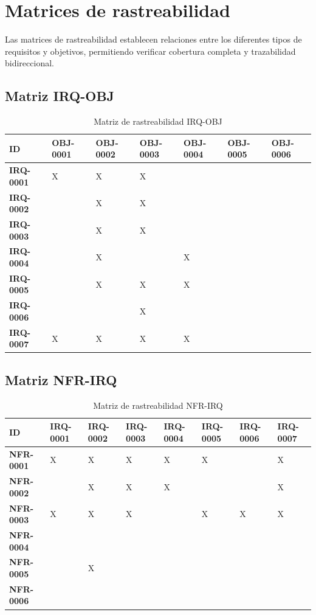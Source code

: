 \documentclass[11pt, a4paper]{article}
\begin{document}
\section{Matrices de rastreabilidad}

Las matrices de rastreabilidad establecen relaciones entre los diferentes tipos de requisitos y objetivos, permitiendo verificar cobertura completa y trazabilidad bidireccional.

\subsection{Matriz IRQ-OBJ}

\begin{table}[htbp]
\centering
\small
\begin{tabular}{|p{2.2cm}|p{2.0cm}|p{2.0cm}|p{2.0cm}|p{2.0cm}|p{2.0cm}|p{2.0cm}|}
\hline
\textbf{ID} & \textbf{OBJ-0001} & \textbf{OBJ-0002} & \textbf{OBJ-0003} & \textbf{OBJ-0004} & \textbf{OBJ-0005} & \textbf{OBJ-0006} \\
\hline
\hline
\textbf{IRQ-0001} & X & X & X & & & \\
\hline
\textbf{IRQ-0002} & & X & X & & & \\
\hline
\textbf{IRQ-0003} & & X & X & & & \\
\hline
\textbf{IRQ-0004} & & X & & X & & \\
\hline
\textbf{IRQ-0005} & & X & X & X & & \\
\hline
\textbf{IRQ-0006} & & & X & & & \\
\hline
\textbf{IRQ-0007} & X & X & X & X & & \\
\hline
\end{tabular}
\caption{Matriz de rastreabilidad IRQ-OBJ}
\label{tab:matriz-irq-obj}
\end{table}

\subsection{Matriz NFR-IRQ}

{\setlength{\tabcolsep}{3pt}
\begin{table}[htbp]
\centering
\footnotesize
\begin{tabular}{|p{1.6cm}|p{1.55cm}|p{1.55cm}|p{1.55cm}|p{1.55cm}|p{1.55cm}|p{1.55cm}|p{1.55cm}|}
\hline
\textbf{ID} & \textbf{IRQ-0001} & \textbf{IRQ-0002} & \textbf{IRQ-0003} & \textbf{IRQ-0004} & \textbf{IRQ-0005} & \textbf{IRQ-0006} & \textbf{IRQ-0007} \\
\hline
\hline
\textbf{NFR-0001} & X & X & X & X & X & & X \\
\hline
\textbf{NFR-0002} & & X & X & X & & & X \\
\hline
\textbf{NFR-0003} & X & X & X & & X & X & X \\
\hline
\textbf{NFR-0004} & & & & & & & \\
\hline
\textbf{NFR-0005} & & X & & & & & \\
\hline
\textbf{NFR-0006} & & & & & & & \\
\hline
\end{tabular}
\caption{Matriz de rastreabilidad NFR-IRQ}
\label{tab:matriz-nfr-irq}
\end{table}}
\end{document}
